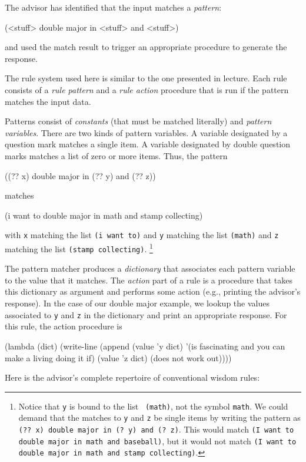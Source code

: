 The advisor has identified that the input matches a {\em pattern}:

\beginlisp
(<stuff> double major in <stuff> and <stuff>)
\endlisp

\noindent
and used the match result to trigger an appropriate procedure
to generate the response.

The rule system used here is similar to the one presented in lecture.
Each rule consists of a {\em rule pattern} and a {\em rule action}
procedure that is run if the pattern matches the input data.

Patterns consist of {\em constants} (that must be matched literally)
and {\em pattern variables}.  There are two kinds of pattern
variables.  A variable designated by a question mark matches a single
item.  A variable designated by double question marks matches a list
of zero or more items.  Thus, the pattern

\beginlisp
((?? x) double major in (?? y) and (?? z))
\endlisp

\noindent
matches

\beginlisp
(i want to double major in math and stamp collecting)
\endlisp

\noindent
with {\tt x} matching the list {\tt (i want to)} and {\tt y} matching
the list {\tt (math)} and {\tt z} matching the list {\tt (stamp
collecting)}.  \footnote{Notice that {\tt y} is bound to the list {\tt
(math)}, not the symbol {\tt math}.  We could demand that the matches
to {\tt y} and {\tt z} be single items by writing the pattern as {\tt
(?? x) double major in (? y) and (? z)}.  This would match {\tt (I
want to double major in math and baseball)}, but it would not match
{\tt (I want to double major in math and stamp collecting)}.}

The pattern matcher produces a {\em dictionary} that associates each
pattern variable to the value that it matches.  The {\em action} part
of a rule is a procedure that takes this dictionary as argument and
performs some action (e.g., printing the advisor's response).
In the case of our double major example, we lookup the values
associated to {\tt y} and {\tt z} in the dictionary and print an
appropriate response.  For this rule, the action procedure is

\beginlisp
(lambda (dict)
  (write-line
   (append
    (value 'y dict)
    '(is fascinating and you can make a living doing it if)
    (value 'z dict)
    (does not work out))))
\endlisp

Here is the advisor's complete repertoire of conventional wisdom
rules:

